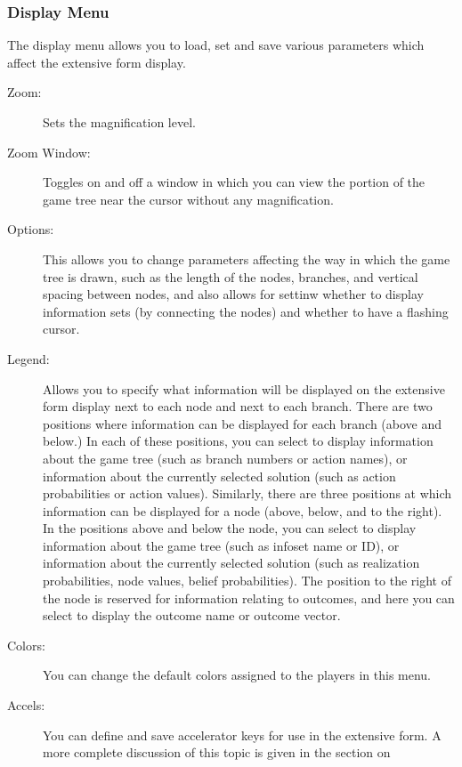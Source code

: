 \subsubsection{Display Menu}\label{displaymenu}
The display menu allows you to load, set and save various parameters 
which affect the extensive form display.  
\begin{description}
\item[Zoom:]  Sets the magnification level.
\item[Zoom Window:]  Toggles on and off a window in which you can view the 
portion of the game tree near the cursor without any magnification.  
\item[Options:] This allows you to change parameters affecting the way in which the 
game tree is drawn, such as the length of the nodes, branches, and 
vertical spacing between nodes, and also allows for settinw whether to display 
information sets (by connecting the nodes) and whether to have a flashing cursor. 
\item[Legend:] Allows you to specify what information will be displayed on the 
extensive form display next to each node and next to each branch.  
There are two positions where information can be displayed for each branch 
(above and below.)   In each of these positions, you can select to display 
information about the game tree (such as branch numbers or action names), 
or information about the currently selected solution (such as action  
probabilities or action values).  
Similarly, there are three positions at which information can be displayed 
for a node (above, below, and to the right).  In the positions above and below 
the node, you can select to display 
information about the game tree (such as infoset name or ID), 
or information about the currently selected solution (such as realization 
probabilities, node values, belief probabilities). The position to the right of the node 
is reserved for information relating to outcomes, and here you can select to display 
the outcome name or outcome vector.  
\item[Colors:] You can change the default colors assigned to the players in this 
menu. 
\item[Accels:]  You can define and save accelerator keys for use in the 
extensive form. A more complete discussion of this topic is given in the section 
on 
\end{description}

